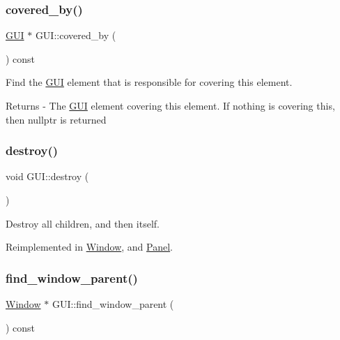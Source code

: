 \subsubsection{\texorpdfstring{covered\+\_\+by()}{covered\_by()}}
{\footnotesize\ttfamily \mbox{\hyperlink{class_g_u_i}{G\+UI}} $\ast$ G\+U\+I\+::covered\+\_\+by (\begin{DoxyParamCaption}{ }\end{DoxyParamCaption}) const}

Find the \mbox{\hyperlink{class_g_u_i}{G\+UI}} element that is responsible for covering this element. \begin{DoxyReturn}{Returns}
-\/ The \mbox{\hyperlink{class_g_u_i}{G\+UI}} element covering this element. If nothing is covering this, then nullptr is returned 
\end{DoxyReturn}
\mbox{\label{class_g_u_i_a2abe7f08a1da35af8ae006fbecea94e0}} 
\subsubsection{\texorpdfstring{destroy()}{destroy()}}
{\footnotesize\ttfamily void G\+U\+I\+::destroy (\begin{DoxyParamCaption}{ }\end{DoxyParamCaption})\hspace{0.3cm}{\ttfamily [virtual]}}

Destroy all children, and then itself. 

Reimplemented in \mbox{\hyperlink{class_window_ac11084e8bd2b61ba1a45266a9a4a0b57}{Window}}, and \mbox{\hyperlink{class_panel_ac21884693c47ee069feb9e963f00e9af}{Panel}}.

\mbox{\label{class_g_u_i_a62d14b39a25ab4de6ccd5c8df6dd8624}} 
\subsubsection{\texorpdfstring{find\+\_\+window\+\_\+parent()}{find\_window\_parent()}}
{\footnotesize\ttfamily \mbox{\hyperlink{class_window}{Window}} $\ast$ G\+U\+I\+::find\+\_\+window\+\_\+parent (\begin{DoxyParamCaption}{ }\end{DoxyParamCaption}) const}

